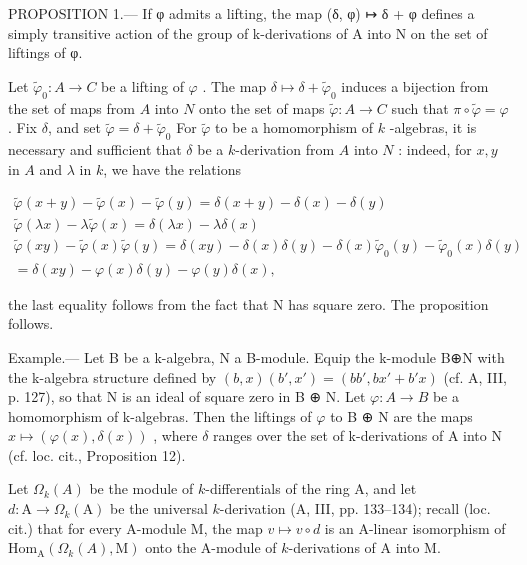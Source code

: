 PROPOSITION 1.--- If φ admits a lifting, the map (δ, φ) ↦ δ + φ defines a simply transitive action of the group of k-derivations of A into N on the set of liftings of φ.

Let \(\tilde{\varphi}_{0}: A \to C\) be a lifting of \(\varphi\) . The map \(\delta \mapsto \delta + \tilde{\varphi}_{0}\) induces a bijection from the set of maps from \(A\) into \(N\) onto the set of maps \(\tilde{\varphi}: A \to C\) such that \(\pi \circ \tilde{\varphi} = \varphi\) . Fix \(\delta\), and set \(\tilde{\varphi} = \delta + \tilde{\varphi}_{0}\) For \(\tilde{\varphi}\) to be a homomorphism of \(k\) -algebras, it is necessary and sufficient that \(\delta\) be a \(k\)-derivation from \(A\) into \(N\) : indeed, for \(x, y\) in \(A\) and \(\lambda\) in \(k\), we have the relations

\[
\begin{array}{c} \tilde {\varphi} (x + y) - \tilde {\varphi} (x) - \tilde {\varphi} (y) = \delta (x + y) - \delta (x) - \delta (y) \\ \tilde {\varphi} (\lambda x) - \lambda \tilde {\varphi} (x) = \delta (\lambda x) - \lambda \delta (x) \\ \tilde {\varphi} (x y) - \tilde {\varphi} (x) \tilde {\varphi} (y) = \delta (x y) - \delta (x) \delta (y) - \delta (x) \tilde {\varphi} _ {0} (y) - \tilde {\varphi} _ {0} (x) \delta (y) \\ = \delta (x y) - \varphi (x) \delta (y) - \varphi (y) \delta (x), \end{array}
\]

the last equality follows from the fact that N has square zero. The proposition follows.

Example.--- Let B be a k-algebra, N a B-module. Equip the k-module B⊕N with the k-algebra structure defined by \((b,x)(b',x') = (bb',bx' + b'x)\) (cf. A, III, p. 127), so that N is an ideal of square zero in B ⊕ N. Let \(\varphi : A \to B\) be a homomorphism of k-algebras. Then the liftings of \(\varphi\) to B ⊕ N are the maps \(x \mapsto (\varphi(x), \delta(x))\) , where \(\delta\) ranges over the set of k-derivations of A into N (cf. loc. cit., Proposition 12).

Let \(\Omega_{k}(A)\) be the module of \(k\)-differentials of the ring A, and let \(d: \mathrm{A} \longrightarrow \Omega_{k}(\mathrm{A})\) be the universal \(k\)-derivation (A, III, pp. 133–134); recall (loc. cit.) that for every A-module M, the map \(v \mapsto v \circ d\) is an A-linear isomorphism of \(\mathrm{Hom}_{\mathrm{A}}(\Omega_{k}(A), \mathrm{M})\) onto the A-module of \(k\)-derivations of A into M.

